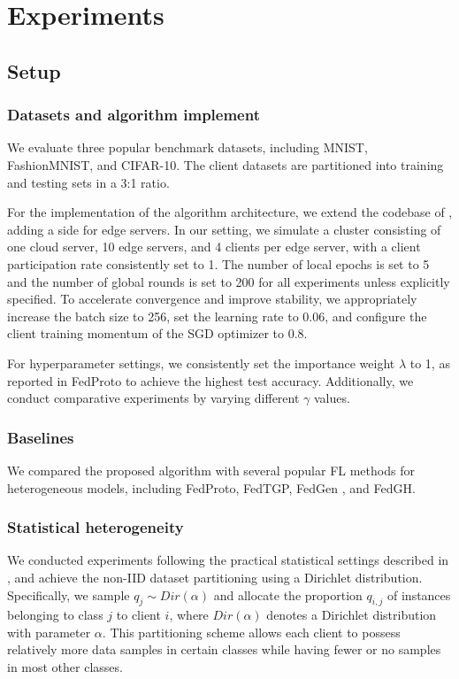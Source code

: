 \documentclass[journal]{IEEEtran}
\begin{document}
\section{Experiments}
\subsection{Setup}
\subsubsection{Datasets and algorithm implement}
We evaluate three popular benchmark datasets, including MNIST\cite{lecun1998mnist}, FashionMNIST\cite{xiao2017fashion}, and CIFAR-10\cite{krizhevsky2009learningcifar10}.  The client datasets are partitioned into training and testing sets in a 3:1 ratio.

For the implementation of the algorithm architecture, we extend the codebase of \cite{zhang2023pfllib}, adding a side for edge servers. In our setting, we simulate a cluster consisting of one cloud server, 10 edge servers, and 4 clients per edge server, with a client participation rate consistently set to 1. The number of local epochs is set to 5 and the number of global rounds is set to 200 for all experiments unless explicitly specified. To accelerate convergence and improve stability, we appropriately increase the batch size to 256, set the learning rate to 0.06, and configure the client training momentum of the SGD optimizer to 0.8.

For hyperparameter settings, we consistently set the importance weight $\lambda$ to 1, as reported in FedProto to achieve the highest test accuracy.  Additionally, we conduct comparative experiments by varying different $\gamma$ values. 
\subsubsection{Baselines}
We compared the proposed algorithm with several popular FL methods for heterogeneous models, including FedProto\cite{tan_fedproto_2021}, FedTGP\cite{zhang_fedtgp_2024}, FedGen\cite{zhu_data-free_fedgen_2021} , and  FedGH\cite{yi_fedgh_2023}.
\subsubsection{Statistical heterogeneity}
We conducted experiments following the practical statistical settings described in \cite{zhang_fedtgp_2024,li2021mode_moon}, and achieve the non-IID dataset partitioning using a Dirichlet distribution. Specifically, we sample \( q_j \sim Dir(\alpha) \) and allocate the proportion \( q_{i,j} \) of instances belonging to class \( j \) to client \( i \), where \( Dir(\alpha) \) denotes a Dirichlet distribution with parameter \(\alpha\). This partitioning scheme allows each client to possess relatively more data samples in certain classes while having fewer or no samples in most other classes.
\end{document}
